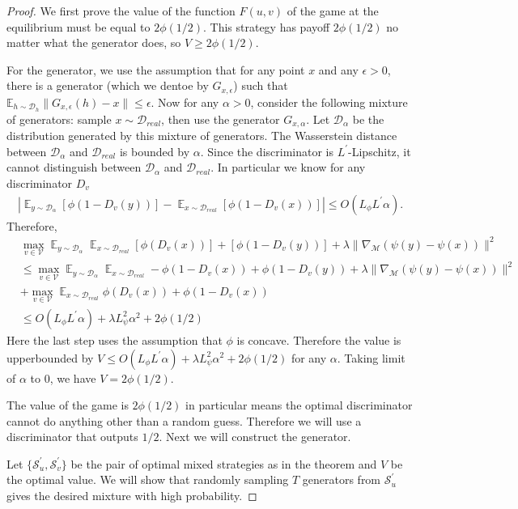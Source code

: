 \documentclass[10pt,twocolumn,letterpaper]{article}
\newcommand{\Eb}{\mathbb{E}}
\newcommand{\di}{{D_v}}
\newcommand{\D}{\mathcal{D}}
\newcommand{\V}{\mathcal{V}}
\newcommand{\M}{\mathcal{M}}
\begin{document}
\begin{proof}
	We first prove the value of the function $F(u,v)$ of the game at the equilibrium must be equal to $2\phi(1/2)$. This strategy has payoff $2\phi(1/2)$ no matter what the generator does, so $V \ge 2\phi(1/2)$.
	
	For the generator, we use the assumption that for any point $x$ and any $\epsilon >0$, there is a generator (which we dentoe by $G_{x,\epsilon}$) such that $\Eb_{h\sim \D_h}\|G_{x,\epsilon}(h)-x\|\le \epsilon$. Now for any $\alpha >0$, consider the following mixture of generators: sample $x \sim \D_{real}$, then use the generator $G_{x,\alpha}$. Let $\D_\alpha$ be the distribution generated by this mixture of generators. The Wasserstein distance between $\D_\alpha$ and $\D_{real}$ is bounded by $\alpha$. Since the discriminator is $L^\prime$-Lipschitz, it cannot distinguish between $\D_\alpha$ and $\D_{real}$. In particular we know for any discriminator $\di$
	\begin{align}
	|\mathop\Eb_{y\sim \D_\alpha}[\phi(1-\di(y))]-\mathop\Eb_{x\sim \D_{real}}[\phi(1-\di(x))]| \le O(L_\phi L^\prime \alpha).
	\end{align}
	Therefore,
	\begin{align}\label{itm1}
	&\max_{v\in \V} \mathop\Eb_{y\sim \D_\alpha}\mathop\Eb_{x\sim \D_{real}}[\phi(\di(x))]+[\phi(1-\di(y))]+\lambda \|\nabla_\M (\psi(y)-\psi(x))\|^2 \nonumber\\
	& \le \max_{v\in \V} \mathop\Eb_{y\sim \D_\alpha}\mathop\Eb_{x\sim \D_{real}}-\phi(1-\di(x))+\phi(1-\di(y))+\lambda \|\nabla_\M (\psi(y)-\psi(x))\|^2 \nonumber\\&+ \max_{v\in \V} \mathop\Eb_{x\sim \D_{real}}\phi(\di(x))+\phi(1-\di(x)) \nonumber\\
	& \le O(L_\phi L^\prime \alpha) +\lambda L_{\psi}^2\alpha^2+2\phi(1/2)
	\end{align}
	Here the last step uses the assumption that $\phi$ is concave. Therefore the value is upperbounded by $V\le O(L_\phi L^\prime \alpha) +\lambda L_{\psi}^2\alpha^2+2\phi(1/2)$ for any $\alpha$. Taking limit of $\alpha$ to $0$, we have $V=2\phi(1/2)$.
	
	The value of the game is $2\phi(1/2)$ in particular means the optimal discriminator cannot do anything other than a random guess. Therefore we will use a discriminator that outputs $1/2$. Next we will construct the generator.
	
	Let $\{\mathcal{S}^\prime_u,\mathcal{S}^\prime_v\}$ be the pair of optimal mixed strategies as in the theorem and $V$ be the optimal value. We will show that randomly sampling $T$ generators from $\mathcal{S}^\prime_u$ gives the desired mixture with high probability. 
	

\end{proof}
\end{document}
